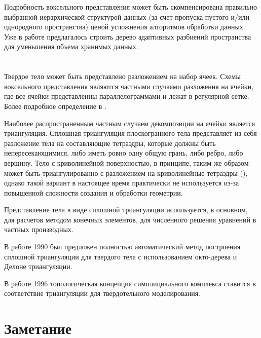 Подробность воксельного представления может быть скомпенсирована правильно выбранной иерархической структурой данных (за счет пропуска пустого и/или однородного пространства) ценой усложнения алгоритмов обработки данных. Уже в работе \cite{REDD78} предлагалось строить дерево адаптивных разбиений пространства для уменьшения объема хранимых данных.


\section{} \label{sect_cell_decompositions}

Твердое тело может быть представлено разложением на набор ячеек. Схемы воксельного представления являются частными случаями разложения на ячейки, где все ячейки представленны параллелограммами и лежат в регулярной сетке. Более подробное определение в \cite{Requicha80}.

Наиболее распространенным частным случаем декомпозиции на ячейки является триангуляция. Сплошная триангуляция плоскогранного тела представляет из себя разложение тела на составляющие тетраэдры, которые должны быть непересекающимися, либо иметь ровно одну общую грань, либо ребро, либо вершину. Тело с криволинейной поверхностью, в принципе, таким же образом может быть триангулированно с разложением на криволинейные тетраэдры (), однако такой вариант в настоящее время практически не используется из-за повышенной сложности создания и обработки геометрии.

Представление тела в виде сплошной триангуляции используется, в основном, для расчетов методом конечных элементов, для численного решения уравнений в частных производных.

В работе \cite{A combined octree/Delaunay method for fully automatic 3-d mesh generation} 1990 был предложен полностью автоматический метод построения сплошной триангуляции для твердого тела с использованием окто-дерева и Делоне триангуляции.

В работе \cite{Modeling with Simplicial Complexes} 1996 топологическая концепция симплициального комплекса ставится в соответствие триангуляции для твердотельного моделирования.


\section{Заметание} \label{sect_sweeping}

